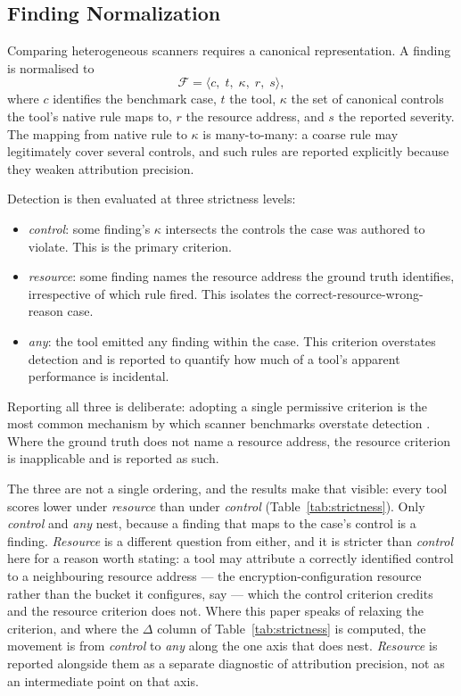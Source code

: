 \documentclass[smallextended]{svjour3}
\begin{document}
\subsection{Finding Normalization}
\label{sec:normalization}
Comparing heterogeneous scanners requires a canonical representation. A finding
is normalised to
\begin{equation}
\mathcal{F} = \langle c,\; t,\; \kappa,\; r,\; s \rangle,
\end{equation}
where $c$ identifies the benchmark case, $t$ the tool, $\kappa$ the set of
canonical controls the tool's native rule maps to, $r$ the resource address, and
$s$ the reported severity. The mapping from native rule to $\kappa$ is
many-to-many: a coarse rule may legitimately cover several controls, and such
rules are reported explicitly because they weaken attribution precision.

Detection is then evaluated at three strictness levels:
\begin{itemize}
\item \emph{control}: some finding's $\kappa$ intersects the controls the case
was authored to violate. This is the primary criterion.
\item \emph{resource}: some finding names the resource address the ground truth
identifies, irrespective of which rule fired. This isolates the
correct-resource-wrong-reason case.
\item \emph{any}: the tool emitted any finding within the case. This criterion
overstates detection and is reported to quantify how much of a tool's apparent
performance is incidental.
\end{itemize}
Reporting all three is deliberate: adopting a single permissive criterion is the
most common mechanism by which scanner benchmarks overstate detection
\citep{habib2018howmany}. Where the ground truth does not name a resource
address, the resource criterion is inapplicable and is reported as such.

The three are not a single ordering, and the results make that visible: every
tool scores lower under \emph{resource} than under \emph{control}
(Table~\ref{tab:strictness}). Only \emph{control} and \emph{any} nest, because a
finding that maps to the case's control is a finding. \emph{Resource} is a
different question from either, and it is stricter than \emph{control} here for a
reason worth stating: a tool may attribute a correctly identified control to a
neighbouring resource address --- the encryption-configuration resource rather
than the bucket it configures, say --- which the control criterion credits and
the resource criterion does not. Where this paper speaks of relaxing the
criterion, and where the $\Delta$ column of Table~\ref{tab:strictness} is
computed, the movement is from \emph{control} to \emph{any} along the one axis
that does nest. \emph{Resource} is reported alongside them as a separate
diagnostic of attribution precision, not as an intermediate point on that axis.
\end{document}
